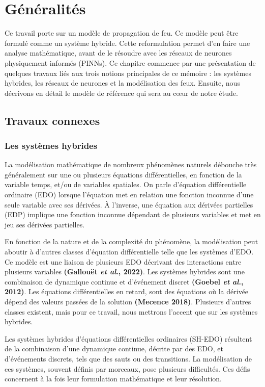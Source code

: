 \documentclass[12pt, oneside]{report} %
\theoremstyle{definition}
\theoremstyle{remark}
\begin{document}
			\chapter{Généralités}
Ce travail porte sur un modèle de propagation de feu. Ce modèle peut être formulé comme un système hybride. Cette reformulation permet d’en faire une analyse mathématique, avant de le résoudre avec les réseaux de neurones physiquement informés (PINNs).
Ce chapitre commence par une présentation de quelques travaux liés aux trois notions principales de ce mémoire : les systèmes hybrides, les réseaux de neurones et la modélisation des feux. Ensuite, nous décrivons en détail le modèle de référence qui sera au cœur de notre étude.

		\section{Travaux connexes}
		\subsection{Les systèmes hybrides}
	La modélisation mathématique de nombreux phénomènes naturels débouche très généralement sur une ou plusieurs équations différentielles, en fonction de la variable temps, et/ou de variables spatiales.
	On parle d'équation différentielle ordinaire (EDO) lorsque l'équation met en relation une fonction inconnue d'une seule variable avec ses dérivées. À l'inverse, une équation aux dérivées partielles (EDP) implique une fonction inconnue dépendant de plusieurs variables et met en jeu ses dérivées partielles.
	
	En fonction de la nature et de la complexité du phénomène, la modélisation peut aboutir à d'autres classes d'équation différentielle telle que les systèmes d'EDO. Ce modèle est une liaison de plusieurs EDO décrivant des interactions entre plusieurs variables \textbf{(Gallouët \textit{et al}., 2022)}. Les systèmes hybrides sont une combinaison de dynamique continue et d'événement discret \textbf{(Goebel \textit{et al}., 2012)}. Les équations différentielles en retard, sont des équations où la dérivée dépend des valeurs passées de la solution \textbf{(Mecence 2018)}. Plusieurs d'autres classes existent, mais pour ce travail, nous mettrons l'accent que sur les systèmes hybrides.\
	
	Les systèmes hybrides d’équations différentielles ordinaires (SH-EDO) résultent de la combinaison d’une dynamique continue, décrite par des EDO, et d’événements discrets, tels que des sauts ou des transitions.
	La modélisation de ces systèmes, souvent définis par morceaux, pose plusieurs difficultés. Ces défis concernent à la fois leur formulation mathématique et leur résolution.
		
\end{document}
